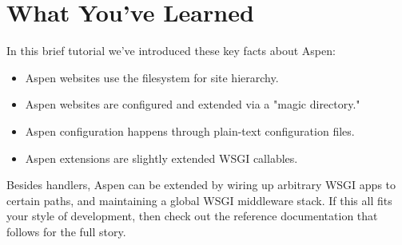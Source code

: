 \section{What You've Learned \label{tutorial-learned}}

In this brief tutorial we've introduced these key facts about Aspen:

\begin{itemize}
\item{Aspen websites use the filesystem for site hierarchy.}
\item{Aspen websites are configured and extended via a "magic directory."}
\item{Aspen configuration happens through plain-text configuration files.}
\item{Aspen extensions are slightly extended WSGI callables.}
\end{itemize}

Besides handlers, Aspen can be extended by wiring up arbitrary WSGI apps to
certain paths, and maintaining a global WSGI middleware stack. If this all fits
your style of development, then check out the reference documentation that
follows for the full story.
